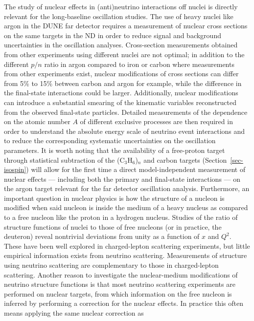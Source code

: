 The study of nuclear effects in (anti)neutrino interactions off nuclei
is directly relevant for the long-baseline oscillation studies.  The
use of heavy nuclei like argon in the DUNE far detector requires a measurement
of nuclear cross sections on the same targets in the ND in order to reduce signal 
and background uncertainties in the oscillation analyses.  Cross-section
measurements obtained from other experiments using different nuclei
are not optimal; in addition to the different $p/n$ ratio in argon
compared to iron or carbon where measurements from other experiments
exist, nuclear modifications of cross sections can differ from 5\% to
15\% between carbon and argon for example, while the difference in the
final-state interactions could be larger.
Additionally, nuclear modifications can introduce a substantial
smearing of the kinematic variables reconstructed from the observed
final-state particles.  Detailed measurements of the dependence on the
atomic number $A$ of different exclusive processes are then required
in order to understand the absolute energy scale of neutrino event
interactions and to reduce the corresponding systematic uncertainties
on the oscillation parameters.
It is worth noting that the availability of a free-proton target
through statistical subtraction of the (C$_3$H$_6$)$_n$ and carbon
targets (Section~\ref{sec-isospin}) will allow for the first time a
direct model-independent measurement of nuclear effects --- including
both the primary and final-state interactions --- on the argon target
relevant for the far detector oscillation analysis.
Furthermore, an important question in nuclear physics is how the
structure of a nucleon is modified when said nucleon is inside the
medium of a heavy nucleus as compared to a free nucleon like the
proton in a hydrogen nucleus.  Studies of the ratio of structure
functions of nuclei to those of free nucleons (or in practice, the
deuteron) reveal nontrivial deviations from unity as a function of $x$
and $Q^2$.  These have been well explored in charged-lepton scattering
experiments, but little empirical information exists from neutrino
scattering. Measurements of structure using neutrino scattering are
complementary to those in charged-lepton scattering.
Another reason to investigate the nuclear-medium modifications 
of neutrino structure functions is that most neutrino scattering
experiments are performed on nuclear targets, from which information
on the free nucleon is inferred by performing a correction for the
nuclear effects.  
%
In practice this often means applying the same nuclear correction as
